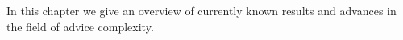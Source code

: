 
In this chapter we give an overview of currently known results and
advances in the field of advice complexity.
